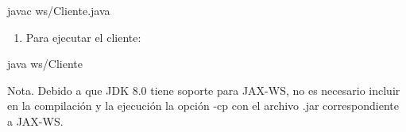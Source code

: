 \begin{SourceCode}
javac ws/Cliente.java
\end{SourceCode}

\begin{enumerate}
\item Para ejecutar el cliente:
\end{enumerate}

\begin{SourceCode}
java ws/Cliente
\end{SourceCode}

Nota. Debido a que JDK 8.0 tiene soporte para JAX-WS, no es necesario incluir en la compilación y la ejecución la opción -cp con el archivo .jar correspondiente a JAX-WS.

\clearpage
